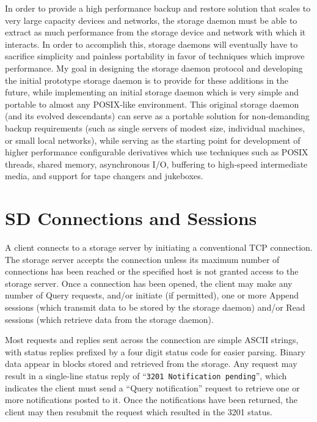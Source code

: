 In order to provide a high performance backup and restore solution that scales
to very large capacity devices and networks, the storage daemon must be able
to extract as much performance from the storage device and network with which
it interacts. In order to accomplish this, storage daemons will eventually
have to sacrifice simplicity and painless portability in favor of techniques
which improve performance. My goal in designing the storage daemon protocol
and developing the initial prototype storage daemon is to provide for these
additions in the future, while implementing an initial storage daemon which is
very simple and portable to almost any POSIX-like environment. This original
storage daemon (and its evolved descendants) can serve as a portable solution
for non-demanding backup requirements (such as single servers of modest size,
individual machines, or small local networks), while serving as the starting
point for development of higher performance configurable derivatives which use
techniques such as POSIX threads, shared memory, asynchronous I/O, buffering
to high-speed intermediate media, and support for tape changers and jukeboxes.


\section{SD Connections and Sessions}

A client connects to a storage server by initiating a conventional TCP
connection. The storage server accepts the connection unless its maximum
number of connections has been reached or the specified host is not granted
access to the storage server. Once a connection has been opened, the client
may make any number of Query requests, and/or initiate (if permitted), one or
more Append sessions (which transmit data to be stored by the storage daemon)
and/or Read sessions (which retrieve data from the storage daemon). 

Most requests and replies sent across the connection are simple ASCII strings,
with status replies prefixed by a four digit status code for easier parsing.
Binary data appear in blocks stored and retrieved from the storage. Any
request may result in a single-line status reply of ``{\tt 3201\ Notification\
pending}'', which indicates the client must send a ``Query notification''
request to retrieve one or more notifications posted to it. Once the
notifications have been returned, the client may then resubmit the request
which resulted in the 3201 status. 

